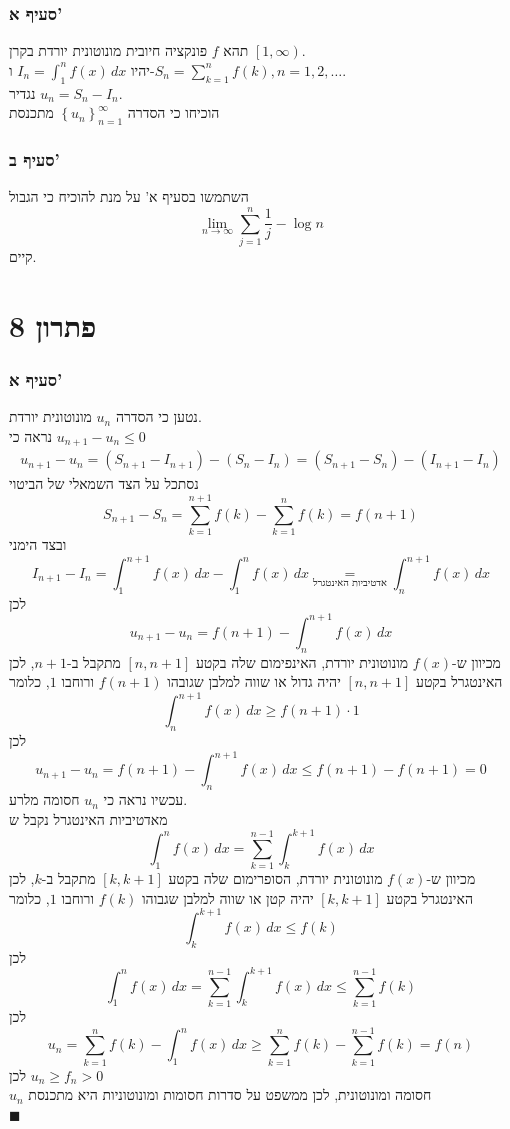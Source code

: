 \documentclass[12pt, titlepage]{article}
\begin{document}
\section*{סעיף א'}
תהא $f$ פונקציה חיובית מונוטונית יורדת בקרן $\left[1,\infty\right)$.\\
יהיו $I_n = \int^n_1 f\left(x\right)\,dx$ ו-$S_n = \sum_{k=1}^n f\left(k\right), n = 1,2,\ldots$.\\
נגדיר $u_n = S_n - I_n$.\\
הוכיחו כי הסדרה $\left\{u_n\right\}_{n=1}^{\infty}$ מתכנסת
\section*{סעיף ב'}
השתמשו בסעיף א' על מנת להוכיח כי הגבול
\[
	\lim_{n\to\infty} \sum_{j=1}^n \frac{1}{j} - \log n
\]
קיים.
\part*{פתרון 8}
\section*{סעיף א'}
נטען כי הסדרה $u_n$ מונוטונית יורדת.\\
נראה כי $u_{n+1} - u_n \leq 0$
\begin{gather*}
    u_{n+1} - u_n = \left(S_{n+1} - I_{n+1}\right) - \left(S_{n} - I_n\right) = \left(S_{n+1} - S_n\right) - \left(I_{n+1} - I_n\right)
\end{gather*}
נסתכל על הצד השמאלי של הביטוי
\[
    S_{n+1} - S_n = \sum_{k=1}^{n+1} f\left(k\right) - \sum_{k=1}^{n} f\left(k\right) = f\left(n+1\right)
\]
ובצד הימני
\[
    I_{n+1} - I_n = \int_{1}^{n+1} f\left(x\right)\,dx - \int_1^{n} f\left(x\right)\,dx \underset{\text{אדטיביות האינטגרל}}{=} \int_n^{n+1} f\left(x\right) \,dx 
\]
לכן
\[
u_{n+1} - u_n = f(n+1) - \int_n^{n+1} f\left(x\right) \,dx
\]
מכיוון ש-$f(x)$ מונוטונית יורדת, האינפימום שלה בקטע $[n,n+1]$ מתקבל ב-$n+1$, לכן האינטגרל בקטע $[n,n+1]$ יהיה גדול או שווה למלבן שגובהו $f\left(n+1\right)$ ורוחבו $1$, כלומר
\[
    \int_n^{n+1} f\left(x\right) \,dx  \geq f\left(n+1\right)\cdot 1
\]
לכן
\[
u_{n+1} - u_n = f\left(n+1\right) - \int_n^{n+1} f\left(x\right) \,dx \leq f\left(n+1\right) - f\left(n+1\right) = 0
\]
עכשיו נראה כי $u_n$ חסומה מלרע.\\
מאדטיביות האינטגרל נקבל ש
\[
    \int_1^n f\left(x\right)\,dx = \sum_{k=1}^{n-1} \int_k^{k+1} f(x)\,dx
\]
מכיוון ש-$f\left(x\right)$ מונוטונית יורדת, הסופרימום שלה בקטע $[k,k+1]$ מתקבל ב-$k$, לכן האינטגרל בקטע $[k,k+1]$ יהיה קטן או שווה למלבן שגבוהו $f\left(k\right)$ ורוחבו $1$, כלומר
\[
\int_k^{k+1} f(x)\,dx \leq f\left(k\right)
\]
לכן
\[
    \int_1^n f\left(x\right)\,dx = \sum_{k=1}^{n-1} \int_k^{k+1} f(x)\,dx \leq \sum_{k=1}^{n-1} f(k)
\]
לכן
\[
    u_n = \sum_{k=1}^n f(k) - \int_1^n f(x) \, dx \geq \sum_{k=1}^n f(k) - \sum_{k=1}^{n-1} f(k) = f(n)
\]
לכן $u_n \geq f_n > 0$\\
$u_n$ חסומה ומונוטונית, לכן ממשפט על סדרות חסומות ומונוטוניות היא מתכנסת\\
$\blacksquare$
\newpage
\end{document}
